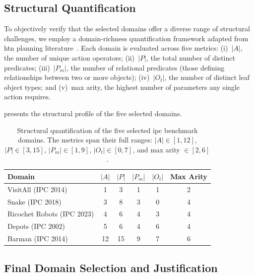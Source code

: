 \subsection{Structural Quantification}

To objectively verify that the selected domains offer a diverse range of structural challenges, we employ a domain-richness quantification framework adapted from \gls{htn} planning literature~\cite{Georgievski2026}.
Each domain is evaluated across five metrics:
(i)~$\lvert A \rvert$, the number of unique action operators;
(ii)~$\lvert P \rvert$, the total number of distinct predicates;
(iii)~$\lvert P_m \rvert$, the number of relational predicates (those defining relationships between two or more objects);
(iv)~$\lvert O_t \rvert$, the number of distinct leaf object types; and
(v)~max arity, the highest number of parameters any single action requires.

 presents the structural profile of the five selected domains.

\begin{table}[htbp]
  \centering
  \caption{Structural quantification of the five selected \gls{ipc} benchmark domains. The metrics span their full ranges: $\lvert A \rvert \in [1, 12]$, $\lvert P \rvert \in [3, 15]$, $\lvert P_m \rvert \in [1, 9]$, $\lvert O_t \rvert \in [0, 7]$, and max arity $\in [2, 6]$.}
  \label{tab:domain_quantification}
  \small
  \begin{tabular}{l c c c c c}
    \toprule
    \textbf{Domain} & $\lvert A \rvert$ & $\lvert P \rvert$ & $\lvert P_m \rvert$ & $\lvert O_t \rvert$ & \textbf{Max Arity} \\
    \midrule
    VisitAll (IPC 2014)       & 1  & 3  & 1 & 1 & 2 \\
    Snake (IPC 2018)          & 3  & 8  & 3 & 0 & 4 \\
    Ricochet Robots (IPC 2023)& 4  & 6  & 4 & 3 & 4 \\
    Depots (IPC 2002)         & 5  & 6  & 4 & 6 & 4 \\
    Barman (IPC 2014)         & 12 & 15 & 9 & 7 & 6 \\
    \bottomrule
  \end{tabular}
\end{table}

\subsection{Final Domain Selection and Justification}

